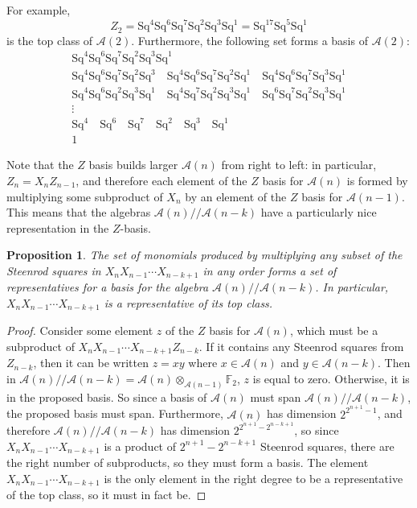 \documentclass{article}
\newcommand{\A}{\mathcal{A}}
\newcommand{\F}{\mathbb{F}}
\newcommand{\Sq}{\mathrm{Sq}}
\newcommand{\mmod}{/\!/\!}
\newtheorem{prop}{Proposition}
\begin{document}
For example,
\[Z_2 = \Sq^4\Sq^6\Sq^7\Sq^2\Sq^3\Sq^1 = \Sq^17 \Sq^5 \Sq^1\]
is the top class of $\A(2)$.  Furthermore, the following set forms a basis of $\A(2)$:
\begin{gather*}
  \Sq^4\Sq^6\Sq^7\Sq^2\Sq^3\Sq^1 \\
  \Sq^4\Sq^6\Sq^7\Sq^2\Sq^3 \quad \Sq^4\Sq^6\Sq^7\Sq^2\Sq^1 \quad \Sq^4\Sq^6\Sq^7\Sq^3\Sq^1 \\
  \Sq^4\Sq^6\Sq^2\Sq^3\Sq^1 \quad \Sq^4\Sq^7\Sq^2\Sq^3\Sq^1 \quad \Sq^6\Sq^7\Sq^2\Sq^3\Sq^1 \\
  \vdots \\
  \Sq^4 \quad \Sq^6 \quad \Sq^7 \quad \Sq^2 \quad \Sq^3 \quad \Sq^1 \\
  1
\end{gather*}

Note that the $Z$ basis builds larger $\A(n)$ from right to left: in particular, $Z_n = X_n Z_{n-1}$, and therefore each element of the $Z$ basis for $\A(n)$ is formed by multiplying some subproduct of $X_n$ by an element of the $Z$ basis for $\A(n-1)$.  This means that the algebras $\A(n)\mmod\A(n-k)$ have a particularly nice representation in the $Z$-basis.

\begin{prop}
  The set of monomials produced by multiplying any subset of the Steenrod squares in $X_n X_{n-1}\cdots X_{n-k+1}$ in any order forms a set of representatives for a basis for the algebra $\A(n)\mmod\A(n-k)$.  In particular, $X_n X_{n-1} \cdots X_{n-k+1}$ is a representative of its top class.
\end{prop}
\begin{proof}
  Consider some element $z$ of the $Z$ basis for $\A(n)$, which must be a subproduct of $X_n X_{n-1}\cdots X_{n-k+1}Z_{n-k}$.  If it contains any Steenrod squares from $Z_{n-k}$, then it can be written $z = xy$ where $x\in \A(n)$ and $y\in \A(n-k)$.  Then in $\A(n)\mmod \A(n-k) = \A(n) \otimes_{\A(n-1)} \F_2$, $z$ is equal to zero.  Otherwise, it is in the proposed basis.  So since a basis of $\A(n)$ must span $\A(n) \mmod \A(n-k)$, the proposed basis must span.  Furthermore, $\A(n)$ has dimension $2^{2^{n+1}-1}$, and therefore $\A(n)\mmod \A(n-k)$ has dimension $2^{2^{n+1}-2^{n-k+1}}$, so since $X_n X_{n-1} \cdots X_{n-k+1}$ is a product of $2^{n+1}-2^{n-k+1}$ Steenrod squares, there are the right number of subproducts, so they must form a basis.  The element $X_n X_{n-1} \cdots X_{n-k+1}$ is the only element in the right degree to be a representative of the top class, so it must in fact be.
\end{proof}
\end{document}
